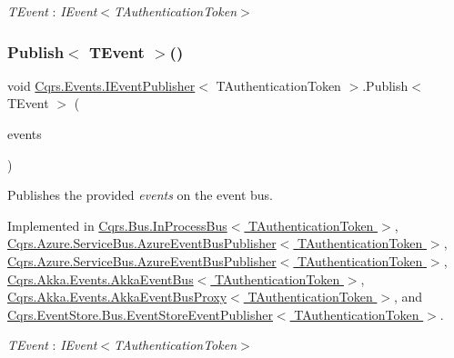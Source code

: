 \begin{Desc}
\item[Type Constraints]\begin{description}
\item[{\em T\+Event} : {\em I\+Event$<$T\+Authentication\+Token$>$}]\end{description}
\end{Desc}
\mbox{\label{interfaceCqrs_1_1Events_1_1IEventPublisher_a2cbcc3d2c24d015abef6337714ec51ff_a2cbcc3d2c24d015abef6337714ec51ff}} 
\subsubsection{\texorpdfstring{Publish$<$ T\+Event $>$()}{Publish< TEvent >()}\hspace{0.1cm}{\footnotesize\ttfamily [2/2]}}
{\footnotesize\ttfamily void \hyperlink{interfaceCqrs_1_1Events_1_1IEventPublisher}{Cqrs.\+Events.\+I\+Event\+Publisher}$<$ T\+Authentication\+Token $>$.Publish$<$ T\+Event $>$ (\begin{DoxyParamCaption}\item[{I\+Enumerable$<$ T\+Event $>$}]{events }\end{DoxyParamCaption})}



Publishes the provided {\itshape events}  on the event bus. 



Implemented in \hyperlink{classCqrs_1_1Bus_1_1InProcessBus_ae154f274db2a028a6094677d83cc1c74_ae154f274db2a028a6094677d83cc1c74}{Cqrs.\+Bus.\+In\+Process\+Bus$<$ T\+Authentication\+Token $>$}, \hyperlink{classCqrs_1_1Azure_1_1ServiceBus_1_1AzureEventBusPublisher_a8bb9cd1172e7dec117cde75eb6b0f056_a8bb9cd1172e7dec117cde75eb6b0f056}{Cqrs.\+Azure.\+Service\+Bus.\+Azure\+Event\+Bus\+Publisher$<$ T\+Authentication\+Token $>$}, \hyperlink{classCqrs_1_1Azure_1_1ServiceBus_1_1AzureEventBusPublisher_a8bb9cd1172e7dec117cde75eb6b0f056_a8bb9cd1172e7dec117cde75eb6b0f056}{Cqrs.\+Azure.\+Service\+Bus.\+Azure\+Event\+Bus\+Publisher$<$ T\+Authentication\+Token $>$}, \hyperlink{classCqrs_1_1Akka_1_1Events_1_1AkkaEventBus_ad5b996dd77efbf51a2b5a32f94417772_ad5b996dd77efbf51a2b5a32f94417772}{Cqrs.\+Akka.\+Events.\+Akka\+Event\+Bus$<$ T\+Authentication\+Token $>$}, \hyperlink{classCqrs_1_1Akka_1_1Events_1_1AkkaEventBusProxy_af4c202eaab00ed2fb6160d5b114d935c_af4c202eaab00ed2fb6160d5b114d935c}{Cqrs.\+Akka.\+Events.\+Akka\+Event\+Bus\+Proxy$<$ T\+Authentication\+Token $>$}, and \hyperlink{classCqrs_1_1EventStore_1_1Bus_1_1EventStoreEventPublisher_a85b4922ff01b088b01b39463681c6eb6_a85b4922ff01b088b01b39463681c6eb6}{Cqrs.\+Event\+Store.\+Bus.\+Event\+Store\+Event\+Publisher$<$ T\+Authentication\+Token $>$}.

\begin{Desc}
\item[Type Constraints]\begin{description}
\item[{\em T\+Event} : {\em I\+Event$<$T\+Authentication\+Token$>$}]\end{description}
\end{Desc}
